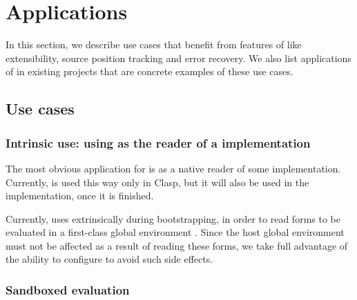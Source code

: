 \section{Applications}
\label{sec-applications}

In this section, we describe use cases that benefit from features of
\eclector{} like extensibility, source position tracking and error
recovery.  We also list applications of \eclector{} in existing \cl{}
projects that are concrete examples of these use cases.

\subsection{Use cases}

\subsubsection{Intrinsic use: using \eclector{} as the reader of a \cl{} implementation}

The most obvious application for \eclector{} is as a native reader of
some \cl{} implementation.  Currently, \eclector{} is used this way
only in Clasp, but it will also be used in the \sicl{} \cl{}
implementation, once it is finished.

Currently, \sicl{} uses \eclector{} extrinsically during
bootstrapping, in order to read forms to be evaluated in a first-class
global environment \cite{Strandh:2015:ELS:Environments}.  Since the
host global environment must not be affected as a result of reading
these forms, we take full advantage of the ability to configure
\eclector{} to avoid such side effects.

%
%
%

\subsubsection{Sandboxed evaluation}

